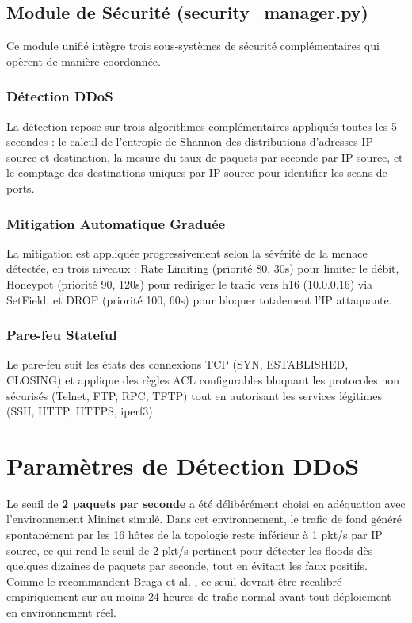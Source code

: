 \documentclass[12pt,a4paper]{report}
\begin{document}
\subsection{Module de Sécurité (security\_manager.py)}
Ce module unifié intègre trois sous-systèmes de sécurité
complémentaires qui opèrent de manière coordonnée.

\subsubsection{Détection DDoS}
La détection repose sur trois algorithmes complémentaires
appliqués toutes les 5 secondes : le calcul de l'entropie
de Shannon des distributions d'adresses IP source et
destination, la mesure du taux de paquets par seconde par
IP source, et le comptage des destinations uniques par IP
source pour identifier les scans de ports.

\subsubsection{Mitigation Automatique Graduée}
La mitigation est appliquée progressivement selon la
sévérité de la menace détectée, en trois niveaux :
Rate Limiting (priorité 80, 30s) pour limiter le débit,
Honeypot (priorité 90, 120s) pour rediriger le trafic
vers h16 (10.0.0.16) via SetField, et DROP (priorité
100, 60s) pour bloquer totalement l'IP attaquante.

\subsubsection{Pare-feu Stateful}
Le pare-feu suit les états des connexions TCP (SYN,
ESTABLISHED, CLOSING) et applique des règles ACL
configurables bloquant les protocoles non sécurisés
(Telnet, FTP, RPC, TFTP) tout en autorisant les services
légitimes (SSH, HTTP, HTTPS, iperf3).

\section{Paramètres de Détection DDoS}
Le seuil de \textbf{2 paquets par seconde} a été
délibérément choisi en adéquation avec l'environnement
Mininet simulé. Dans cet environnement, le trafic de
fond généré spontanément par les 16 hôtes de la topologie
reste inférieur à 1 pkt/s par IP source, ce qui rend le
seuil de 2 pkt/s pertinent pour détecter les floods dès
quelques dizaines de paquets par seconde, tout en évitant
les faux positifs. Comme le recommandent Braga et al.
\cite{braga2010lightweight}, ce seuil devrait être
recalibré empiriquement sur au moins 24 heures de trafic
normal avant tout déploiement en environnement réel.
\end{document}
